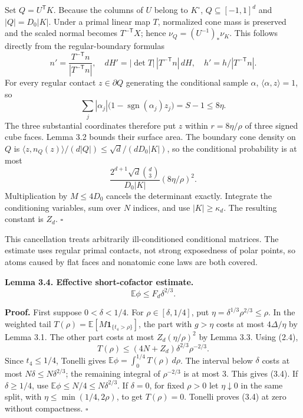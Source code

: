 \documentclass[
  11pt,
]{article}
\begin{document}
Set \(Q=U^{\mathsf T}K\). Because the columns of \(U\) belong to
\(K^\circ\), \(Q\subseteq[-1,1]^d\) and \(|Q|=D_0|K|\). Under a primal
linear map \(T\), normalized cone mass is preserved and the scaled
normal becomes \(T^{-\mathsf T}X\); hence \(\nu_Q=(U^{-1})_*\nu_K\).
This follows directly from the regular-boundary formulas \[
 n'=\frac{T^{-\mathsf T}n}{|T^{-\mathsf T}n|},\quad
 dH'=|\det T|\,|T^{-\mathsf T}n|\,dH,\quad
 h'=h/|T^{-\mathsf T}n|.
\] For every regular contact \(z\in\partial Q\) generating the
conditional sample \(\alpha\), \(\langle\alpha,z\rangle=1\), so \[
 \sum_j|\alpha_j|\bigl(1-\operatorname{sgn}(\alpha_j)z_j\bigr)
 =S-1\le8\eta.
\] The three substantial coordinates therefore put \(z\) within
\(r=8\eta/\rho\) of three signed cube faces. Lemma 3.2 bounds their
surface area. The boundary cone density on \(Q\) is
\(\langle z,n_Q(z)\rangle/(d|Q|)\le\sqrt d/(dD_0|K|)\), so the
conditional probability is at most \[
 \frac{2^{d+1}\sqrt d\binom d3}{D_0|K|}(8\eta/\rho)^2.
\] Multiplication by \(M\le4D_0\) cancels the determinant exactly.
Integrate the conditioning variables, sum over \(N\) indices, and use
\(|K|\ge\kappa_d\). The resulting constant is \(Z_d\). \(\square\)

This cancellation treats arbitrarily ill-conditioned conditional
matrices. The estimate uses regular primal contacts, not strong
exposedness of polar points, so atoms caused by flat faces and nonatomic
cone laws are both covered.

\textbf{Lemma 3.4. Effective short-cofactor estimate.} \[
 \boxed{\mathbb E\phi\le F_d\delta^{2/3}.}                       \tag{3.4}
\]

\textbf{Proof.} First suppose \(0<\delta<1/4\). For
\(\rho\in[\delta,1/4]\), put \(\eta=\delta^{1/3}\rho^{2/3}\le\rho\). In
the weighted tail \(T(\rho)=\mathbb E[M\mathbf1_{\{t_4>\rho\}}]\), the
part with \(g>\eta\) costs at most \(4\Delta/\eta\) by Lemma 3.1. The
other part costs at most \(Z_d(\eta/\rho)^2\) by Lemma 3.3. Using (2.4),
\[
 T(\rho)\le(4N+Z_d)\delta^{2/3}\rho^{-2/3}.
\] Since \(t_4\le1/4\), Tonelli gives
\(\mathbb E\phi=\int_0^{1/4}T(\rho)\,d\rho\). The interval below
\(\delta\) costs at most \(N\delta\le N\delta^{2/3}\); the remaining
integral of \(\rho^{-2/3}\) is at most 3. This gives (3.4). If
\(\delta\ge1/4\), use \(\mathbb E\phi\le N/4\le N\delta^{2/3}\). If
\(\delta=0\), for fixed \(\rho>0\) let \(\eta\downarrow0\) in the same
split, with \(\eta\le\min(1/4,2\rho)\), to get \(T(\rho)=0\). Tonelli
proves (3.4) at zero without compactness. \(\square\)
\end{document}
